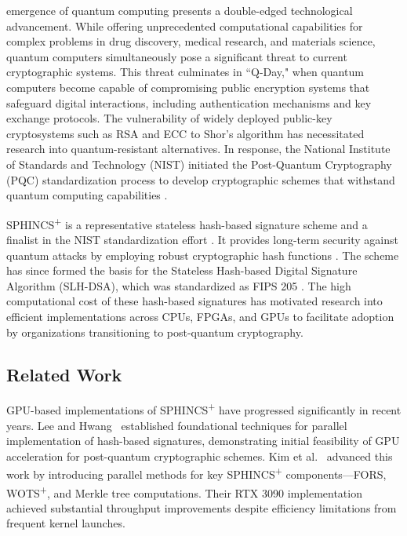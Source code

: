 \documentclass[journal]{IEEEtran}
\begin{document}
 emergence of quantum computing presents a double-edged technological advancement. While offering unprecedented computational capabilities for complex problems in drug discovery, medical research, and materials science, quantum computers simultaneously pose a significant threat to current cryptographic systems. This threat culminates in ``Q-Day," when quantum computers become capable of compromising public encryption systems that safeguard digital interactions, including authentication mechanisms and key exchange protocols. The vulnerability of widely deployed public-key cryptosystems such as RSA and ECC to Shor's algorithm \cite{Shor1994} has necessitated research into quantum-resistant alternatives. In response, the National Institute of Standards and Technology (NIST) initiated the Post-Quantum Cryptography (PQC) standardization process to develop cryptographic schemes that withstand quantum computing capabilities \cite{NIST2016}.

SPHINCS\textsuperscript{+} is a representative stateless hash-based signature scheme and a finalist in the NIST standardization effort \cite{Turan}. It provides long-term security against quantum attacks by employing robust cryptographic hash functions \cite{Bernstein2019}. The scheme has since formed the basis for the Stateless Hash-based Digital Signature Algorithm (SLH-DSA), which was standardized as FIPS 205 \cite{FIPS205}. The high computational cost of these hash-based signatures has motivated research into efficient implementations across CPUs, FPGAs, and GPUs \cite{Joseph2022} to facilitate adoption by organizations transitioning to post-quantum cryptography.

\subsection{Related Work}

GPU-based implementations of SPHINCS\textsuperscript{+} have progressed significantly in recent years. Lee and Hwang~\cite{Lee2022} established foundational techniques for parallel implementation of hash-based signatures, demonstrating initial feasibility of GPU acceleration for post-quantum cryptographic schemes. Kim et al.~\cite{Kim2024} advanced this work by introducing parallel methods for key SPHINCS\textsuperscript{+} components—FORS, WOTS\textsuperscript{+}, and Merkle tree computations. Their RTX 3090 implementation achieved substantial throughput improvements despite efficiency limitations from frequent kernel launches.
\end{document}

